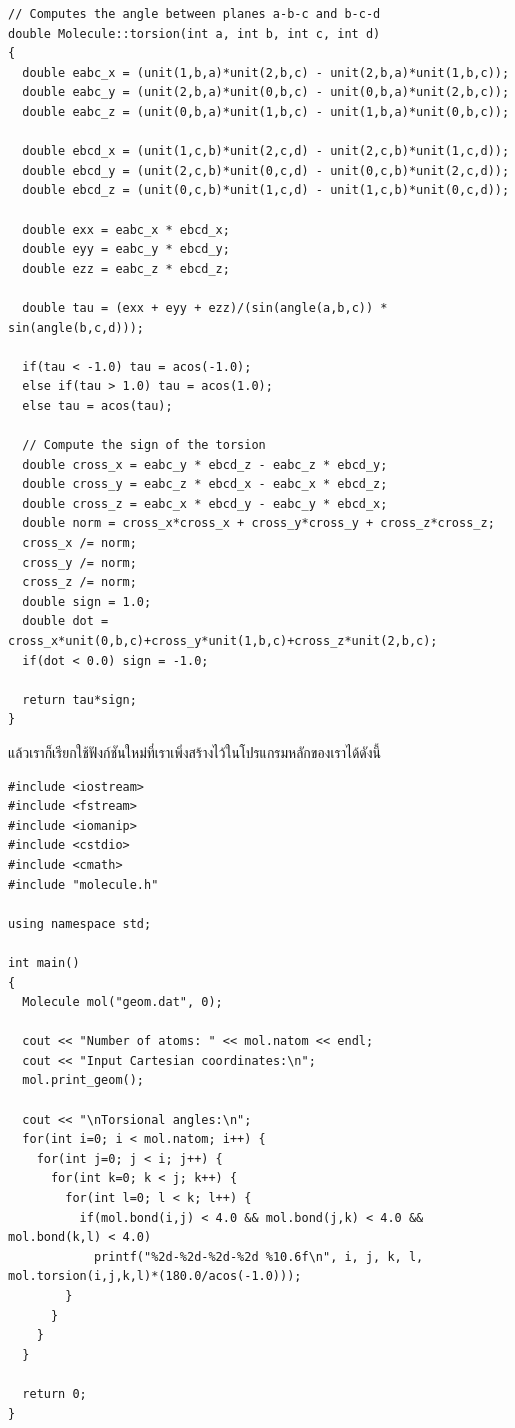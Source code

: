 \vspace{5pt}

\begin{lstlisting}[style=MyC++]
// Computes the angle between planes a-b-c and b-c-d
double Molecule::torsion(int a, int b, int c, int d)
{
  double eabc_x = (unit(1,b,a)*unit(2,b,c) - unit(2,b,a)*unit(1,b,c));
  double eabc_y = (unit(2,b,a)*unit(0,b,c) - unit(0,b,a)*unit(2,b,c));
  double eabc_z = (unit(0,b,a)*unit(1,b,c) - unit(1,b,a)*unit(0,b,c));

  double ebcd_x = (unit(1,c,b)*unit(2,c,d) - unit(2,c,b)*unit(1,c,d));
  double ebcd_y = (unit(2,c,b)*unit(0,c,d) - unit(0,c,b)*unit(2,c,d));
  double ebcd_z = (unit(0,c,b)*unit(1,c,d) - unit(1,c,b)*unit(0,c,d));

  double exx = eabc_x * ebcd_x;
  double eyy = eabc_y * ebcd_y;
  double ezz = eabc_z * ebcd_z;

  double tau = (exx + eyy + ezz)/(sin(angle(a,b,c)) * sin(angle(b,c,d)));

  if(tau < -1.0) tau = acos(-1.0);
  else if(tau > 1.0) tau = acos(1.0);
  else tau = acos(tau);

  // Compute the sign of the torsion 
  double cross_x = eabc_y * ebcd_z - eabc_z * ebcd_y;
  double cross_y = eabc_z * ebcd_x - eabc_x * ebcd_z;
  double cross_z = eabc_x * ebcd_y - eabc_y * ebcd_x;
  double norm = cross_x*cross_x + cross_y*cross_y + cross_z*cross_z;
  cross_x /= norm;
  cross_y /= norm;
  cross_z /= norm;
  double sign = 1.0;
  double dot = cross_x*unit(0,b,c)+cross_y*unit(1,b,c)+cross_z*unit(2,b,c);
  if(dot < 0.0) sign = -1.0;

  return tau*sign;
}
\end{lstlisting}

\vspace{5pt}

แล้วเราก็เรียกใช้ฟังก์ชันใหม่ที่เราเพิ่งสร้างไว้ในโปรแกรมหลักของเราได้ดังนี้

\vspace{5pt}

\begin{lstlisting}[style=MyC++]
#include <iostream>
#include <fstream>
#include <iomanip>
#include <cstdio>
#include <cmath>
#include "molecule.h"

using namespace std;

int main()
{
  Molecule mol("geom.dat", 0);

  cout << "Number of atoms: " << mol.natom << endl;
  cout << "Input Cartesian coordinates:\n";
  mol.print_geom();

  cout << "\nTorsional angles:\n";
  for(int i=0; i < mol.natom; i++) {
    for(int j=0; j < i; j++) {
      for(int k=0; k < j; k++) {
        for(int l=0; l < k; l++) {
          if(mol.bond(i,j) < 4.0 && mol.bond(j,k) < 4.0 && mol.bond(k,l) < 4.0)
            printf("%2d-%2d-%2d-%2d %10.6f\n", i, j, k, l, mol.torsion(i,j,k,l)*(180.0/acos(-1.0)));
        }
      }
    }
  }

  return 0;
}
\end{lstlisting}

